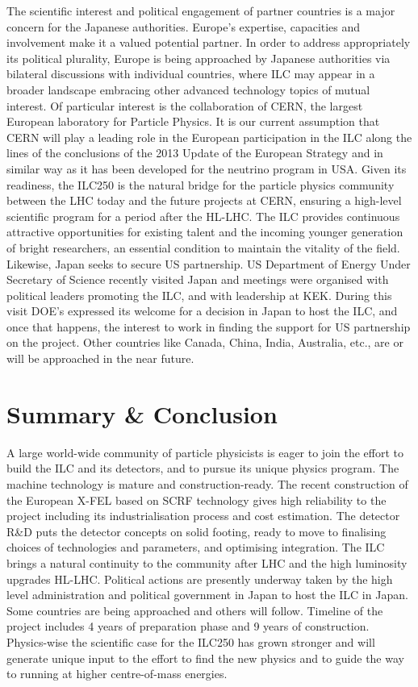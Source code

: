 \documentclass[%
 reprint,
 amsmath,amssymb,
 aps,
]{revtex4-1}
\begin{document}
The scientific interest and political engagement of partner countries is a major concern for the Japanese authorities. Europe's expertise, capacities and involvement make it a valued potential partner. In order to address appropriately its political plurality, Europe is being approached by Japanese authorities via bilateral discussions with individual countries, where ILC may appear in a broader landscape embracing other advanced technology topics of mutual interest. Of particular interest is the collaboration of CERN, the largest European laboratory for Particle Physics. It is our current assumption that CERN will play a leading role in the European participation in the ILC along the lines of the conclusions of the 2013 Update of the European Strategy and in similar way as it has been developed for the neutrino program in USA. Given its readiness, the ILC250 is the natural bridge for the particle physics community between the LHC today and the future projects at CERN, ensuring a high-level scientific program for a period after the HL-LHC. The ILC  provides continuous attractive opportunities for existing talent and the incoming younger generation of bright researchers, an essential condition to maintain the vitality of the field.  Likewise, Japan seeks to secure US partnership. US Department of Energy Under Secretary of Science recently visited Japan and meetings were organised with political leaders promoting the ILC, and with leadership at KEK. During this visit DOE's expressed its welcome for a decision in Japan to host the ILC, and once that happens, the interest to work in finding the support for US partnership on the project. Other countries like Canada, China, India, Australia, etc., are or will be approached in the near future.

\section{\label{sec:sum}Summary \& Conclusion} 

A large world-wide community of particle physicists is eager to join the effort to build the
ILC and its detectors, and to pursue its unique physics program.  The machine technology is mature
and construction-ready. The recent construction of the European X-FEL based on SCRF technology gives high reliability to the project including its industrialisation process and cost estimation. The detector R\&D puts the detector concepts on solid footing, ready to move to finalising choices of technologies and parameters, and optimising integration. The ILC brings a natural continuity to the community after LHC and the high luminosity upgrades HL-LHC. Political actions are presently underway taken by the high level administration and political government in Japan to host the ILC in Japan. Some countries are being approached and others will follow. Timeline of the project includes 4 years of preparation phase and 9 years of construction. Physics-wise the scientific case for the ILC250 has grown stronger and will generate unique input to the effort to find the new physics and to guide the way to running at higher centre-of-mass energies.
\end{document}
